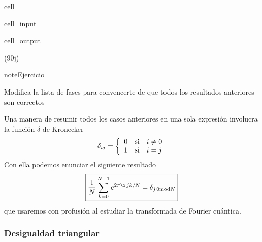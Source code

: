 \documentclass[letterpaper,10pt,english]{jupyterBook}
\begin{document}
\begin{sphinxuseclass}{cell}
\begin{sphinxVerbatimInput}
\begin{sphinxuseclass}{cell_input}
\end{sphinxuseclass}\end{sphinxVerbatimInput}
\begin{sphinxVerbatimOutput}

\begin{sphinxuseclass}{cell_output}
\begin{sphinxVerbatim}[commandchars=\\\{\}]
(9\PYGZhy{}0j)
\end{sphinxVerbatim}

\noindent{}

\end{sphinxuseclass}\end{sphinxVerbatimOutput}

\end{sphinxuseclass}
\begin{sphinxadmonition}{note}{Ejercicio}

\sphinxAtStartPar
Modifica la lista de fases para convencerte de que todos los resultados anteriores son correctos
\end{sphinxadmonition}

\sphinxAtStartPar
Una manera de resumir todos los casos anteriores en una sola expresión involucra la función \(\delta\) de Kronecker
\begin{equation*}
\begin{split}
\delta_{ij} = \left\{ \begin{array}{rcl} 0 & \hbox{si} & i\neq 0 \\ 1 & \hbox{si} & i = j \end{array} \right.
\end{split}
\end{equation*}
\sphinxAtStartPar
Con ella podemos enunciar el siguiente resultado
\begin{equation*}
\begin{split}
\boxed{\frac{1}{N}\sum_{k=0}^{N-1} e^{2\pi \i \, j k/N} =  \delta_{j\, 0{\rm mod} N}}
\end{split}
\end{equation*}
\sphinxAtStartPar
que usaremos con profusión al estudiar la transformada de Fourier cuántica.


\subsubsection{Desigualdad triangular}
\label{\detokenize{docs/Part_01_Formalismo/Chapter_01_02_Formalismo_matem_xe1tico/01_01_Numeros_Complejos_myst:desigualdad-triangular}}
\sphinxAtStartPar
\end{document}
